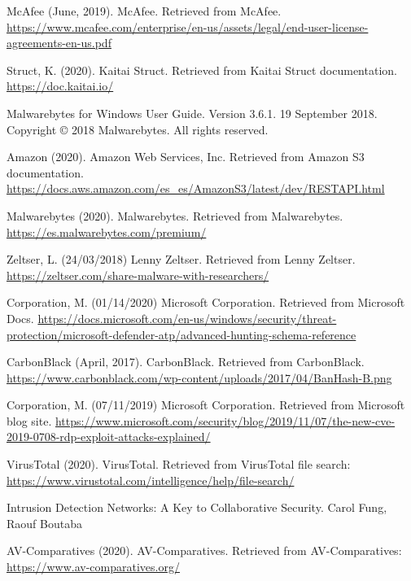 \begin{thebibliography}{0}
    McAfee (June, 2019). McAfee. Retrieved from McAfee.
    \url{https://www.mcafee.com/enterprise/en-us/assets/legal/end-user-license-agreements-en-us.pdf}

    Struct, K. (2020). Kaitai Struct. Retrieved from Kaitai Struct documentation.
    \url{https://doc.kaitai.io/}

    Malwarebytes for Windows User Guide. Version 3.6.1. 19 September 2018. Copyright © 2018 Malwarebytes. All rights reserved.

    Amazon (2020). Amazon Web Services, Inc. Retrieved from Amazon S3 documentation.
    \url{https://docs.aws.amazon.com/es_es/AmazonS3/latest/dev/RESTAPI.html}

    Malwarebytes (2020). Malwarebytes. Retrieved from Malwarebytes.
    \url{https://es.malwarebytes.com/premium/}

    Zeltser, L. (24/03/2018) Lenny Zeltser. Retrieved from Lenny Zeltser.
    \url{https://zeltser.com/share-malware-with-researchers/}

    Corporation, M. (01/14/2020) Microsoft Corporation. Retrieved from Microsoft Docs.
    \url{https://docs.microsoft.com/en-us/windows/security/threat-protection/microsoft-defender-atp/advanced-hunting-schema-reference}

    CarbonBlack (April, 2017). CarbonBlack. Retrieved from CarbonBlack.
    \url{https://www.carbonblack.com/wp-content/uploads/2017/04/BanHash-B.png}

    Corporation, M. (07/11/2019) Microsoft Corporation. Retrieved from Microsoft blog site.
    \url{https://www.microsoft.com/security/blog/2019/11/07/the-new-cve-2019-0708-rdp-exploit-attacks-explained/}

    VirusTotal (2020). VirusTotal. Retrieved from VirusTotal file search:
\url{https://www.virustotal.com/intelligence/help/file-search/}

    Intrusion Detection Networks: A Key to Collaborative Security. Carol Fung, Raouf Boutaba

    AV-Comparatives (2020). AV-Comparatives. Retrieved from AV-Comparatives:
    \url{https://www.av-comparatives.org/}


\end{thebibliography}
